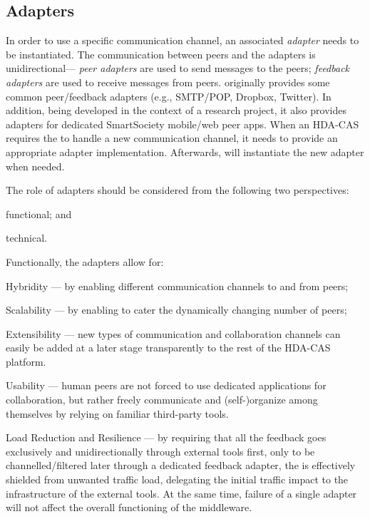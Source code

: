 
  \subsection{Adapters}
  \label{sec:adapters}

    In order to use a specific communication channel, an associated \emph{adapter} needs to be instantiated. The communication between peers and the adapters is unidirectional--- \emph{peer adapters} are used to send messages to the peers; \emph{feedback adapters} are used to receive messages from peers. 
    \mdl{} originally provides some common peer/feedback adapters  (e.g., SMTP/POP, Dropbox, Twitter). In addition, being developed in the context of a research project, it also provides adapters for dedicated SmartSociety mobile/web peer apps. When an HDA-CAS requires the \mdl{} to handle a new communication channel, it needs to provide an appropriate adapter implementation. Afterwards, \mdl{} will instantiate the new adapter when needed.

    The role of adapters should be considered from the following two perspectives:
    \begin{inparaenum}[\itshape i)]
    \item functional; and 
    \item technical.
    \end{inparaenum}

    Functionally, the adapters allow for:
    \begin{inparaenum}[\itshape a)]
    \item Hybridity --- by enabling different communication channels to and from peers;
    \item Scalability --- by enabling \mdl{} to cater the dynamically changing number of peers;
    \item Extensibility --- new types of communication and collaboration channels can easily be added at a later stage transparently to the rest of the HDA-CAS platform.
    \item Usability --- human peers are not forced to use dedicated applications for collaboration, but rather freely communicate and (self-)organize among themselves by relying on familiar third-party tools.
    \item Load Reduction and Resilience --- by requiring that all the feedback goes exclusively and unidirectionally through external tools first, only to be channelled/filtered later through a dedicated feedback adapter, the \mdl{} is effectively shielded from unwanted traffic load, delegating the initial traffic impact to the infrastructure of the external tools. At the same time, failure of a single adapter will not affect the overall functioning of the middleware.
    \end{inparaenum}

